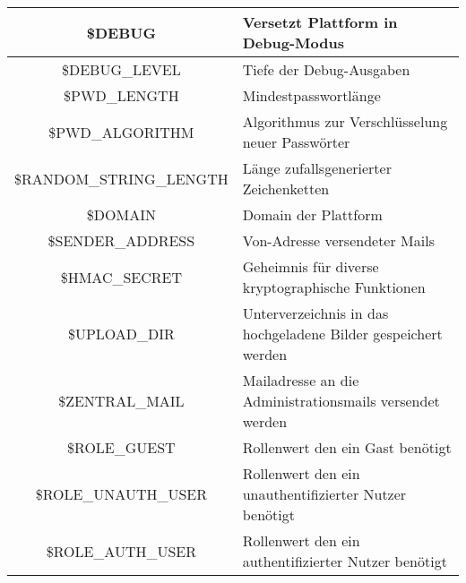 \begin{longtable}[H]{|c|l|}
		\$DEBUG              & Versetzt Plattform in Debug-Modus                                                                                                     \\ \hline	
		\$DEBUG\_LEVEL       & Tiefe der Debug-Ausgaben                                                                                                     \\ \hline	
		\$PWD\_LENGTH        & Mindestpasswortlänge                                                                                                     \\ \hline	
		\$PWD\_ALGORITHM     & Algorithmus zur Verschlüsselung neuer Passwörter                                                                                                     \\ \hline	
		\$RANDOM\_STRING\_LENGTH     & Länge zufallsgenerierter Zeichenketten                                                                                                     \\ \hline	
		\$DOMAIN            & Domain der Plattform                                                                                                     \\ \hline	
		\$SENDER\_ADDRESS   & Von-Adresse versendeter Mails                                                                                                     \\ \hline	
		\$HMAC\_SECRET      & Geheimnis für diverse kryptographische Funktionen                                                                                                     \\ \hline	
		\$UPLOAD\_DIR       & Unterverzeichnis in das hochgeladene Bilder gespeichert werden                                                                                                   \\ \hline	
		\$ZENTRAL\_MAIL     & Mailadresse an die Administrationsmails versendet werden                                                                                                     \\ \hline	
		\$ROLE\_GUEST       & Rollenwert den ein Gast benötigt                                                                                                    \\ \hline	
		\$ROLE\_UNAUTH\_USER         & Rollenwert den ein unauthentifizierter Nutzer benötigt                                                                                                    \\ \hline	
		\$ROLE\_AUTH\_USER           & Rollenwert den ein authentifizierter Nutzer benötigt                                                                                                    \\ \hline	

\end{longtable}
